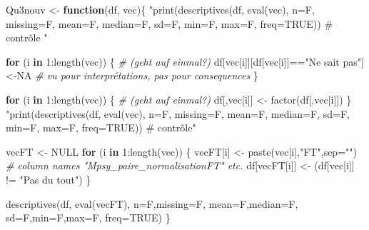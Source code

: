 \documentclass[
]{article}
\newenvironment{Shaded}{\begin{snugshade}}{\end{snugshade}}
\newcommand{\AttributeTok}[1]{\textcolor[rgb]{0.77,0.63,0.00}{#1}}
\newcommand{\CommentTok}[1]{\textcolor[rgb]{0.56,0.35,0.01}{\textit{#1}}}
\newcommand{\ConstantTok}[1]{\textcolor[rgb]{0.00,0.00,0.00}{#1}}
\newcommand{\ControlFlowTok}[1]{\textcolor[rgb]{0.13,0.29,0.53}{\textbf{#1}}}
\newcommand{\DecValTok}[1]{\textcolor[rgb]{0.00,0.00,0.81}{#1}}
\newcommand{\FunctionTok}[1]{\textcolor[rgb]{0.00,0.00,0.00}{#1}}
\newcommand{\NormalTok}[1]{#1}
\newcommand{\OtherTok}[1]{\textcolor[rgb]{0.56,0.35,0.01}{#1}}
\newcommand{\SpecialCharTok}[1]{\textcolor[rgb]{0.00,0.00,0.00}{#1}}
\newcommand{\StringTok}[1]{\textcolor[rgb]{0.31,0.60,0.02}{#1}}
\begin{document}
\begin{Shaded}
\begin{Highlighting}[]
\NormalTok{Qu3nouv }\OtherTok{\textless{}{-}} \ControlFlowTok{function}\NormalTok{(df, vec)\{}
  \StringTok{"print(descriptives(df, eval(vec), }
\StringTok{                     n=F, missing=F, mean=F, median=F, sd=F, min=F, max=F,}
\StringTok{                     freq=TRUE))           \# contrôle "}

  \ControlFlowTok{for}\NormalTok{ (i }\ControlFlowTok{in} \DecValTok{1}\SpecialCharTok{:}\FunctionTok{length}\NormalTok{(vec)) \{                           }\CommentTok{\# (geht auf einmal?)}
\NormalTok{    df[vec[i]][df[vec[i]]}\SpecialCharTok{==}\StringTok{"Ne sait pas"}\NormalTok{]}\OtherTok{\textless{}{-}}\ConstantTok{NA}          \CommentTok{\# vu pour interprétations, pas pour consequences}
\NormalTok{  \}}

  \ControlFlowTok{for}\NormalTok{ (i }\ControlFlowTok{in} \DecValTok{1}\SpecialCharTok{:}\FunctionTok{length}\NormalTok{(vec)) \{                           }\CommentTok{\# (geht auf einmal?)}
\NormalTok{    df[,vec[i]] }\OtherTok{\textless{}{-}} \FunctionTok{factor}\NormalTok{(df[,vec[i]])}
\NormalTok{  \}}
  \StringTok{"print(descriptives(df, eval(vec), }
\StringTok{                     n=F, missing=F, mean=F, median=F, sd=F, min=F, max=F,}
\StringTok{                     freq=TRUE))           \# contrôle"}

\NormalTok{  vecFT }\OtherTok{\textless{}{-}} \ConstantTok{NULL}
  \ControlFlowTok{for}\NormalTok{ (i }\ControlFlowTok{in} \DecValTok{1}\SpecialCharTok{:}\FunctionTok{length}\NormalTok{(vec)) \{}
\NormalTok{    vecFT[i] }\OtherTok{\textless{}{-}} \FunctionTok{paste}\NormalTok{(vec[i],}\StringTok{"FT"}\NormalTok{,}\AttributeTok{sep=}\StringTok{""}\NormalTok{)  }\CommentTok{\# column names "Mpsy\_paire\_normalisationFT" etc.}
\NormalTok{    df[vecFT[i]] }\OtherTok{\textless{}{-}}\NormalTok{ (df[vec[i]] }\SpecialCharTok{!=} \StringTok{"Pas du tout"}\NormalTok{)       }
\NormalTok{  \}}

  \FunctionTok{descriptives}\NormalTok{(df, }\FunctionTok{eval}\NormalTok{(vecFT),}
               \AttributeTok{n=}\NormalTok{F,}\AttributeTok{missing=}\NormalTok{F, }\AttributeTok{mean=}\NormalTok{F,}\AttributeTok{median=}\NormalTok{F, }\AttributeTok{sd=}\NormalTok{F,}\AttributeTok{min=}\NormalTok{F,}\AttributeTok{max=}\NormalTok{F,}
               \AttributeTok{freq=}\ConstantTok{TRUE}\NormalTok{)}
\NormalTok{\}}
\end{Highlighting}
\end{Shaded}
\end{document}
